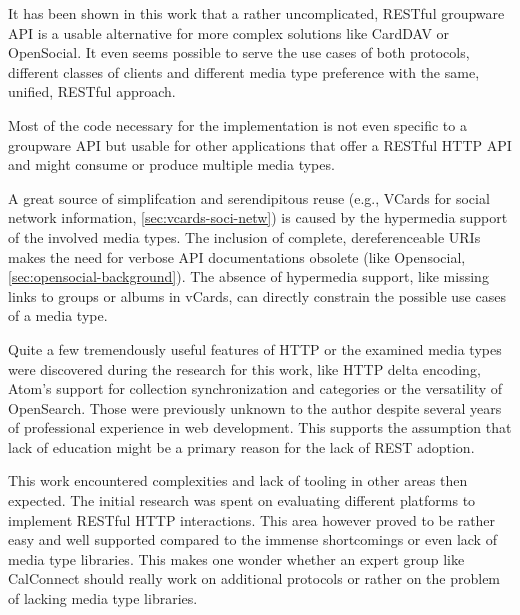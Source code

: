 \documentclass[11pt,a4paper,headsepline,twoside]{scrartcl}		%
\begin{document}
It has been shown in this work that a rather uncomplicated, RESTful groupware
API is a usable alternative for more complex solutions like CardDAV or
OpenSocial. It even seems possible to serve the use cases of both protocols,
different classes of clients and different media type preference with the same,
unified, RESTful approach.

Most of the code necessary for the implementation is not even specific to a
groupware API but usable for other applications that offer a RESTful HTTP API
and might consume or produce multiple media types.

A great source of simplifcation and serendipitous reuse (e.g., VCards for social
network information, \autoref{sec:vcards-soci-netw}) is caused by the hypermedia
support of the involved media types.  The inclusion of complete, dereferenceable
URIs makes the need for verbose API documentations obsolete (like Opensocial,
\autoref{sec:opensocial-background}). The absence of hypermedia support, like
missing links to groups or albums in vCards, can directly constrain the possible
use cases of a media type.

Quite a few tremendously useful features of HTTP or the examined media types were
discovered during the research for this work, like HTTP delta encoding, Atom's
support for collection synchronization and categories or the versatility of
OpenSearch. Those were previously unknown to the author despite several years of
professional experience in web development. This supports the assumption that
lack of education might be a primary reason for the lack of REST adoption.

This work encountered complexities and lack of tooling in other areas then
expected. The initial research was spent on evaluating different platforms to
implement RESTful HTTP interactions. This area however proved to be rather easy
and well supported compared to the immense shortcomings or even lack of
media type libraries. This makes one wonder whether an expert group like
CalConnect should really work on additional protocols or rather on the problem
of lacking media type libraries.

\newpage
{}

\end{document}

